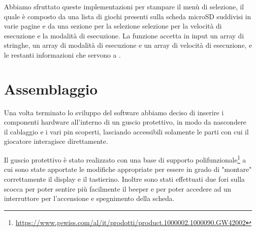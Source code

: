 \documentclass[a4paper]{article}
\begin{document}
Abbiamo sfruttato queste implementazioni per stampare il menù di selezione, il quale
è composto da una lista di giochi presenti sulla scheda microSD suddivisi in varie pagine
e da una sezione per la selezione selezione per la velocità di esecuzione e la modalità
di esecuzione. La funzione accetta in input un array di stringhe, un array di modalità di
esecuzione e un array di velocità di esecuzione, e le restanti informazioni che servono
a {}.

\section{Assemblaggio}

Una volta terminato lo sviluppo del software abbiamo deciso di inserire i componenti hardware
all'interno di un guscio protettivo, in modo da nascondere il cablaggio e i vari pin scoperti,
lasciando accessibili solamente le parti con cui il giocatore interagisce direttamente.

Il guscio protettivo è stato realizzato con una base di supporto
polifunzionale\footnote{\url{https://www.gewiss.com/al/it/prodotti/product.1000002.1000090.GW42002}}
a cui sono state apportate le modifiche appropriate per essere in grado di "montare" correttamente
il display e il tastierino. Inoltre sono stati effettuati due fori sulla scocca per poter sentire
più facilmente il beeper e per poter accedere ad un interruttore per l'accensione e spegnimento
della scheda.
\end{document}
